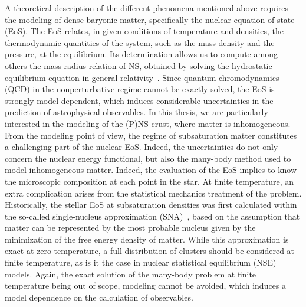 A theoretical description of the different phenomena mentioned above requires 
the modeling of dense baryonic matter, specifically the nuclear equation of 
state (EoS). 
%
The EoS relates, in given conditions of temperature and 
densities, {the thermodynamic quantities of the system, such as the mass
  density and the pressure, at the equilibrium. Its determination allows us 
  to compute} among others the mass-radius relation of NS, obtained by solving 
  the hydrostatic equilibrium equation in general 
  relativity~\cite{Tolman1939,Oppenheimer1939}.
%
Since quantum chromodynamics (QCD) in the nonperturbative regime cannot be 
exactly solved, the EoS is strongly model dependent, which induces considerable 
uncertainties in the prediction of astrophysical observables. 
In this thesis, we are particularly interested in the modeling of the (P)NS 
crust, where matter is inhomogeneous. From the modeling point of view, the 
regime of subsaturation matter {constitutes a challenging} part of the 
nuclear EoS. Indeed, the uncertainties do not only concern the nuclear energy 
functional, but also the many-body method used to model inhomogeneous matter. 
%
Indeed, the evaluation of the EoS implies to know the microscopic composition 
at each point in the star. At finite temperature, an extra complication arises
from the statistical mechanics treatment of the problem. 
Historically, the stellar EoS at subsaturation 
densities was first calculated within the so-called single-nucleus 
approximation (SNA)~\cite{BBP,Negele1973}, based on the assumption that matter 
can be represented by the most probable nucleus given by the minimization of 
the free energy density of matter. While this approximation is exact at zero
temperature, a full distribution of clusters should be considered at finite
temperature, as is it the case in nuclear statistical equilibrium (NSE) models. 
Again, the exact solution of the many-body problem at finite temperature being 
out of scope, modeling cannot be avoided, which induces a model dependence on 
the calculation of observables. 

